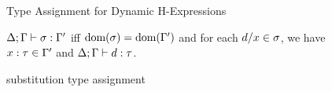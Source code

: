 \begin{figure}[!ht]
\begin{mathpar}






\end{mathpar}
\caption{Type Assignment for Dynamic H-Expressions}
\label{fig:hasType}
\end{figure}

\begin{figure}[!ht]
  \begin{definition}
    $\hasType{\Delta}{\hGamma}{\sigma}{\hGamma'}$ iff $\domof{\sigma} = \domof{\Gamma'}$ and for each $\dexp/x \in \sigma$, we have $x : \htau \in \hGamma'$ and $\hasType{\Delta}{\hGamma}{\dexp}{\htau}$.
  \end{definition}
  \caption{substitution type assignment}
\end{figure}

